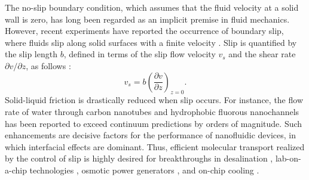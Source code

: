 \documentclass[journal=jacsat,manuscript=article]{achemso}
\begin{document}
The no-slip boundary condition, which assumes that the fluid velocity at a solid wall is zero, has long been regarded as an implicit premise in fluid mechanics. However, recent experiments have reported the occurrence of boundary slip, where fluids slip along solid surfaces with a finite velocity \cite{Huang2007-kv, Chen2022-hs, Cross2018-bc, Zhu2012-wb, Vinogradova1995-ct, Vinogradova2003-gh, Li2022-qs}. Slip is quantified by the slip length \(b\), defined in terms of the slip flow velocity \(v_{s}\) and the shear rate \(\partial v / \partial z \), as follows \cite{Navier1827-nw}: 
\begin{equation}
  v_s = b \left( \frac{\partial v}{\partial z} \right)_{z=0}. \label{eqn:definition of slip length}
\end{equation}
Solid-liquid friction is drastically reduced when slip occurs. For instance, the flow rate of water through carbon nanotubes \cite{Holt2006-yw} and hydrophobic fluorous nanochannels \cite{Itoh2022-hd} has been reported to exceed continuum predictions by orders of magnitude. Such enhancements are decisive factors for the performance of nanofluidic devices, in which interfacial effects are dominant. Thus, efficient molecular transport realized by the control of slip is highly desired for breakthroughs in desalination \cite{Itoh2022-hd}, lab-on-a-chip technologies \cite{Shuvo2025-xv}, osmotic power generators \cite{Laucirica2021-fw, Ma2021-sr}, and on-chip cooling \cite{Sarvar2025-xk, Van_Erp2020-rm}.
\end{document}
